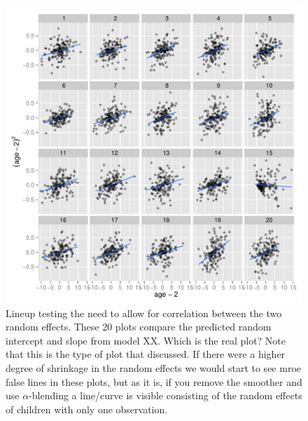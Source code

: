 \documentclass{article} %
\begin{document}
\begin{figure}
	\centering
	\includegraphics[width=\textwidth]{ranef3_lineup15.pdf}
	\caption{\label{fig:lineup-ranef3} Lineup testing the need to allow for correlation between the two random effects. These 20 plots compare the predicted random intercept and slope from model XX. Which is the real plot? Note that this is the type of plot that \cite{Morrell:2000ve} discussed. If there were a higher degree of shrinkage in the random effects we would start to see mroe false lines in these plots, but as it is, if you remove the smoother and use $\alpha$-blending a line/curve is visible consisting of the random effects of children with only one observation.}
\end{figure}
\end{document}
